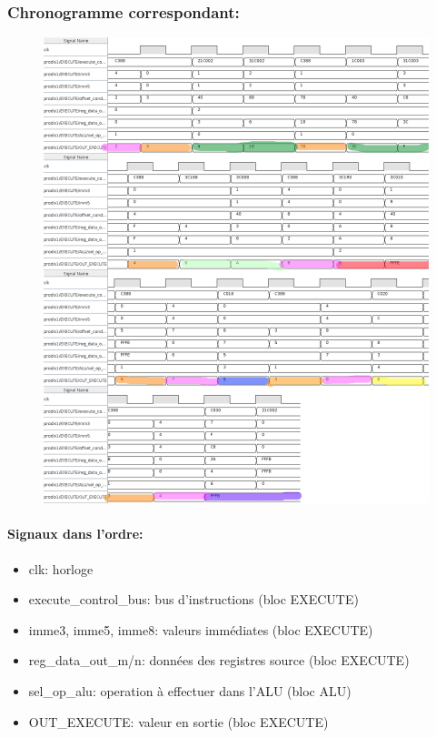 \documentclass[a4paper]{article} %
\begin{document}
\subsubsection{Chronogramme correspondant:}
\begin{figure}[H]
    \centering
    \includegraphics[width=1\textwidth]{src/CHRONO_FINAL_COL.png}
    \label{fig:chrono_final_pic}
\end{figure}
\paragraph{Signaux dans l'ordre:}
\begin{itemize}
    \item     clk: horloge
    \item     execute\_control\_bus: bus d'instructions (bloc EXECUTE)
    \item     imme3, imme5, imme8: valeurs immédiates (bloc EXECUTE)
    \item     reg\_data\_out\_m/n: données des registres source (bloc EXECUTE)
    \item     sel\_op\_alu: operation à effectuer dans l'ALU (bloc ALU)
    \item     OUT\_EXECUTE: valeur en sortie (bloc EXECUTE)
\end{itemize}
\end{document}
